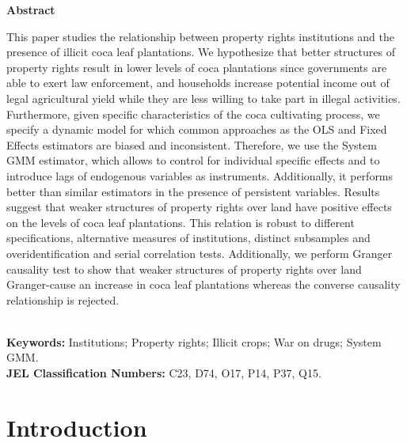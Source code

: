 \textbf{Abstract} %
\begin{footnotesize}
This paper studies the relationship between property rights institutions and the presence of illicit coca leaf plantations. We hypothesize that better structures of property rights result in lower levels of coca plantations since governments are able to exert law enforcement, and households increase potential income out of legal agricultural yield while they are less willing to take part in illegal activities. Furthermore, given specific characteristics of the coca cultivating process, we specify a dynamic model for which common approaches as the OLS and Fixed Effects estimators are biased and inconsistent. Therefore, we use the System GMM estimator, which allows to control for individual specific effects and to introduce lags of endogenous variables as instruments. Additionally, it performs better than similar estimators in the presence of persistent variables. Results suggest that weaker structures of property rights over land have positive effects on the levels of coca leaf plantations. This relation is robust to different specifications, alternative measures of institutions, distinct subsamples and overidentification and serial correlation tests. Additionally, we perform Granger causality test to show that weaker structures of property rights over land Granger-cause an increase in coca leaf plantations whereas the converse causality relationship is rejected.
\end{footnotesize}
\\[0.5cm]
\textbf{Keywords:} Institutions; Property rights; Illicit crops; War on drugs; System GMM. \\
\textbf{JEL Classification Numbers:} C23, D74, O17, P14, P37, Q15.

\pagebreak%

\onehalfspacing
\renewcommand{\thefootnote}{\arabic{footnote}}
\addtocounter{footnote}{-3}


\section{Introduction}
\label{intro}


